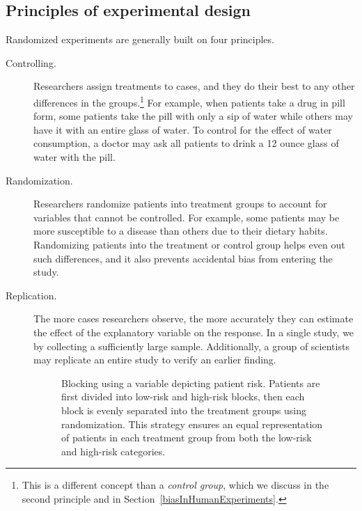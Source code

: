 \subsection{Principles of experimental design}
\label{experimentalDesignPrinciples}

\noindent{}Randomized experiments are generally built on four principles.

\begin{description}
\item[Controlling.]
    Researchers assign treatments to cases, and they do their
    best to  any other differences in the
    groups.\footnote{This is a different concept than
      a \emph{control group}, which we discuss in
      the second principle and in
      Section~\ref{biasInHumanExperiments}.}
    For example, when patients take a drug in pill form,
    some patients take the pill with only a sip of water
    while others may have it with an entire glass of water.
    To control for the effect of water consumption,
    a doctor may ask all patients to drink a 12 ounce glass
    of water with the pill.
\item[Randomization.] Researchers randomize patients into treatment groups to account for variables that cannot be controlled. For example, some patients may be more susceptible to a disease than others due to their dietary habits. Randomizing patients into the treatment or control group helps even out such differences, and it also prevents accidental bias from entering the study.
\item[Replication.] The more cases researchers observe, the more accurately they can estimate the effect of the explanatory variable on the response. In a single study, we  by collecting a sufficiently large sample. Additionally, a group of scientists may replicate an entire study to verify an earlier finding.

\begin{figure}
  \centering
  \caption{Blocking using a variable depicting patient risk.
      Patients are first divided into low-risk and high-risk
      blocks, then each block is evenly separated into the
      treatment groups using randomization.
      This strategy ensures an equal representation of patients
      in each treatment group from both the low-risk and high-risk
      categories.}
  \label{figureShowingBlocking}
\end{figure}


\end{description}
